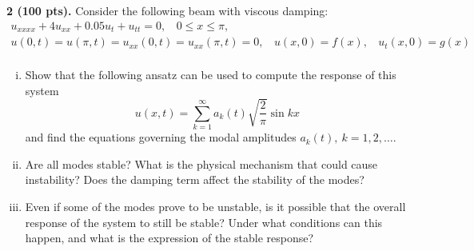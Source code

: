 \newpage
\begin{problem}
    \textbf{2 (100 pts).} Consider the following beam with viscous damping: 
    \begin{equation}\label{eqn:hw4_p2_gov_eqn}
    \begin{gathered}
        u_{xxxx} + 4u_{xx} + 0.05 u_{t} + u_{tt} = 0, ~~~~ 0 \leq x \leq \pi, \\
        u(0, t) = u(\pi, t) = u_{xx}(0, t) = u_{xx}(\pi, t) = 0, ~~~~ u(x, 0) = f(x), ~~~~ u_t(x, 0) = g(x)\\
    \end{gathered}
    \end{equation}
    \begin{enumerate}[(i)]
        \item {
            Show that the following ansatz can be used to compute the response of this system 
            \begin{equation}\label{eqn:hw4_p2_ansatz}
                u(x, t) = \sum_{k=1}^{\infty}a_k(t) \sqrt{\frac{2}{\pi}} \sin kx
            \end{equation}
            and find the equations governing the modal amplitudes $a_k(t), ~k=1,2,\ldots$.
        }
        \item {
            Are all modes stable? 
            What is the physical mechanism that could cause instability? 
            Does the damping term affect the stability of the modes?
        }
        \item {
            Even if some of the modes prove to be unstable, is it possible that the overall response of the system to still be stable? 
            Under what conditions can this happen, and what is the expression of the stable response?
        }
    \end{enumerate}
\end{problem}
